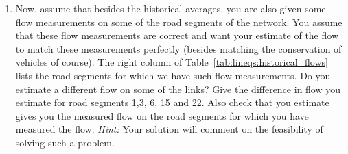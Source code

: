 \documentclass[11pt]{article}
\begin{document}
\begin{enumerate}
\item Now, assume that besides the historical averages, you are also given some flow measurements on some of the road segments of the network. You assume that these flow measurements are correct and want your estimate of the flow to match these measurements perfectly (besides matching the conservation of vehicles of course). The right column of
Table~\ref{tab:lineqs:historical_flows}
lists the road segments for which we have such flow measurements. Do you estimate a different flow on some of the links? Give the difference in flow you estimate for road segments 1,3, 6, 15 and 22. Also check that you estimate gives you the measured flow on the road segments for which you have measured the flow. {\em Hint:} Your solution will comment on the feasibility of solving such a problem.

\end{enumerate}
\end{document}

